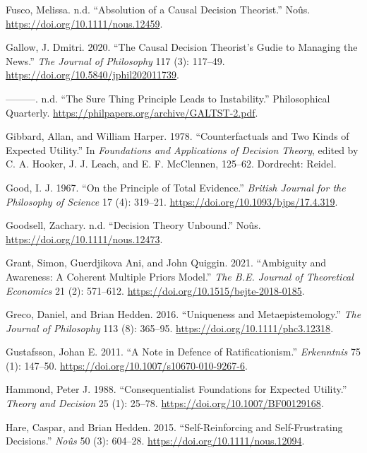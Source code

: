 \documentclass[
  12pt,
  letterpaper,
  DIV=11,
  numbers=noendperiod]{scrreprt}
\newlength{\cslhangindent}
\newenvironment{CSLReferences}[2] %
 {\begin{list}{}{%
  \setlength{\itemindent}{0pt}
  \setlength{\leftmargin}{0pt}
  \setlength{\parsep}{0pt}
  \ifodd #1
   \setlength{\leftmargin}{\cslhangindent}
   \setlength{\itemindent}{-1\cslhangindent}
  \fi
  \setlength{\itemsep}{#2\baselineskip}}}
 {\end{list}}
\begin{document}
\begin{CSLReferences}{1}{0}
Fusco, Melissa. n.d. {``Absolution of a Causal Decision Theorist.''}
No{û}s. \url{https://doi.org/10.1111/nous.12459}.

Gallow, J. Dmitri. 2020. {``The Causal Decision Theorist's Gudie to
Managing the News.''} \emph{The Journal of Philosophy} 117 (3): 117--49.
\url{https://doi.org/10.5840/jphil202011739}.

---------. n.d. {``The Sure Thing Principle Leads to Instability.''}
Philosophical Quarterly.
\url{https://philpapers.org/archive/GALTST-2.pdf}.

Gibbard, Allan, and William Harper. 1978. {``Counterfactuals and Two
Kinds of Expected Utility.''} In \emph{Foundations and Applications of
Decision Theory}, edited by C. A. Hooker, J. J. Leach, and E. F.
McClennen, 125--62. Dordrecht: Reidel.

Good, I. J. 1967. {``On the Principle of Total Evidence.''}
\emph{British Journal for the Philosophy of Science} 17 (4): 319--21.
\url{https://doi.org/10.1093/bjps/17.4.319}.

Goodsell, Zachary. n.d. {``Decision Theory Unbound.''} No{û}s.
\url{https://doi.org/10.1111/nous.12473}.

Grant, Simon, Guerdjikova Ani, and John Quiggin. 2021. {``Ambiguity and
Awareness: A Coherent Multiple Priors Model.''} \emph{The B.E. Journal
of Theoretical Economics} 21 (2): 571--612.
\url{https://doi.org/10.1515/bejte-2018-0185}.

Greco, Daniel, and Brian Hedden. 2016. {``Uniqueness and
Metaepistemology.''} \emph{The Journal of Philosophy} 113 (8): 365--95.
\url{https://doi.org/10.1111/phc3.12318}.

Gustafsson, Johan E. 2011. {``A Note in Defence of Ratificationism.''}
\emph{Erkenntnis} 75 (1): 147--50.
\url{https://doi.org/10.1007/s10670-010-9267-6}.

Hammond, Peter J. 1988. {``Consequentialist Foundations for Expected
Utility.''} \emph{Theory and Decision} 25 (1): 25--78.
\url{https://doi.org/10.1007/BF00129168}.

Hare, Caspar, and Brian Hedden. 2015. {``Self-Reinforcing and
Self-Frustrating Decisions.''} \emph{Noûs} 50 (3): 604--28.
\url{https://doi.org/10.1111/nous.12094}.


\end{CSLReferences}
\end{document}
